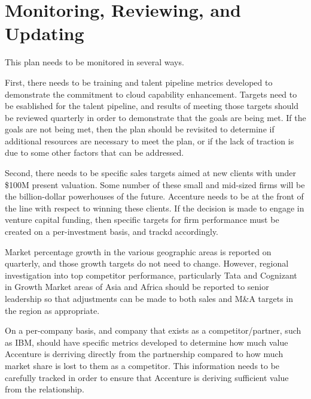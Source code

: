 \section{Monitoring, Reviewing, and Updating}

This plan needs to be monitored in several ways.

First, there needs to be training and talent pipeline metrics developed to demonstrate the commitment to cloud capability enhancement. Targets need to be esablished for the talent pipeline, and results of meeting those targets should be reviewed quarterly in order to demonstrate that the goals are being met. If the goals are not being met, then the plan should be revisited to determine if additional resources are necessary to meet the plan, or if the lack of traction is due to some other factors that can be addressed.

Second, there needs to be specific sales targets aimed at new clients with under \$100M present valuation. Some number of these small and mid-sized firms will be the billion-dollar powerhouses of the future. Accenture needs to be at the front of the line with respect to winning these clients. If the decision is made to engage in venture capital funding, then specific targets for firm performance must be created on a per-investment basis, and trackd accordingly.

Market percentage growth in the various geographic areas is reported on quarterly, and those growth targets do not need to change. However, regional investigation into top competitor performance, particularly Tata and Cognizant in Growth Market areas of Asia and Africa should be reported to senior leadership so that adjustments can be made to both sales and M\&A targets in the region as appropriate.

On a per-company basis, and company that exists as a competitor/partner, such as IBM, should have specific metrics developed to determine how much value Accenture is derriving directly from the partnership compared to how much market share is lost to them as a competitor. This information needs to be carefully tracked in order to ensure that Accenture is deriving sufficient value from the relationship.
